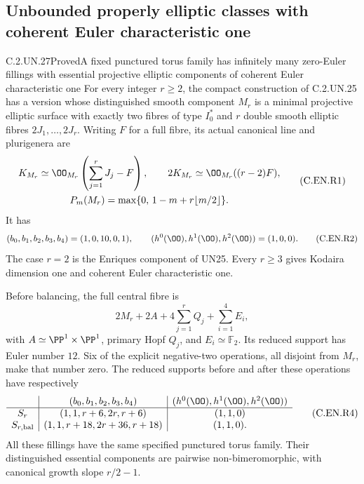 \subsection{Unbounded properly elliptic classes with coherent Euler characteristic one}

\begin{statement}{C.2.UN.27}{Proved}{A fixed punctured torus family has infinitely many zero-Euler fillings with essential projective elliptic components of coherent Euler characteristic one}
For every integer $r\ge2$, the compact construction
of C.2.UN.25 has a version whose distinguished smooth
component $M_r$ is a minimal projective elliptic
surface with exactly two fibres of type $I_0^*$
and $r$ double smooth elliptic fibres $2J_1,\ldots,2J_r$.
Writing $F$ for a full fibre, its actual canonical
line and plurigenera are
\[
 \begin{gathered}
 K_{M_r}\simeq\OO_{M_r}\left(\sum_{j=1}^rJ_j-F\right),
 \qquad
 2K_{M_r}\simeq\OO_{M_r}((r-2)F),
 \\
 P_m(M_r)=\max\{0,\,1-m+r\lfloor m/2\rfloor\}.
 \end{gathered}
                                                               \tag{C.EN.R1}
\]
It has
\[
 (b_0,b_1,b_2,b_3,b_4)=(1,0,10,0,1),\qquad
 (h^0(\OO),h^1(\OO),h^2(\OO))=(1,0,0).
                                                               \tag{C.EN.R2}
\]
The case $r=2$ is the Enriques component of UN25.
Every $r\ge3$ gives Kodaira dimension one and
coherent Euler characteristic one.

Before balancing, the full central fibre is
\[
 2M_r+2A+4\sum_{j=1}^r Q_j+\sum_{i=1}^4E_i,
                                                               \tag{C.EN.R3}
\]
with $A\simeq\PP^1\times\PP^1$, primary Hopf
$Q_j$, and $E_i\simeq\mathbb F_2$.
Its reduced support has Euler number $12$.
Six of the explicit negative-two operations,
all disjoint from $M_r$, make that number zero.
The reduced supports before and after these
operations have respectively
\[
 \begin{array}{c|c|c}
 &(b_0,b_1,b_2,b_3,b_4)&(h^0(\OO),h^1(\OO),h^2(\OO))\\ \hline
 S_r&(1,1,r+6,2r,r+6)&(1,1,0)\\
 S_{r,\mathrm{bal}}&(1,1,r+18,2r+36,r+18)&(1,1,0).
 \end{array}                                             \tag{C.EN.R4}
\]
All these fillings have the same specified punctured
torus family. Their distinguished essential components
are pairwise non-bimeromorphic, with canonical growth
slope $r/2-1$.
\end{statement}
